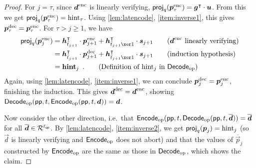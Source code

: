 \begin{proof}
For $j=\tau$, since $\boldsymbol{d}^{\mathrm{enc}}$ is linearly verifying, $\mathsf{proj}_{q}(\boldsymbol{p}_{\tau}^{\mathrm{enc}}) = \boldsymbol{g}^\intercal\cdot\boldsymbol{u}$. From this we get $\mathsf{proj}_{q}(\boldsymbol{p}_{\tau}^{\mathrm{enc}}) = \mathrm{hint}_\tau$.
Using \autoref{lem:latencode}, \autoref{item:inverse1}, this gives $\boldsymbol{p}_{\tau}^{\mathrm{dec}} = \boldsymbol{p}_{\tau}^{\mathrm{enc}}$.
For $\tau > j \geq 1$, we have
\begin{align*}
 \projmod{q}(\vec{p}_{j}^{\ENC}) &= \vec{h}_{\tilde t_{j+1}}^\transpose\cdot \vec{p}_{j+1}^{\ENC} + \vec{h}_{\tilde t_{j+1} \xor 1}^\transpose \cdot \vec{s}_{j+1} \tag{$\vec{d}^{\ENC}$ linearly verifying}\\
                               {}&= \vec{h}_{\tilde t_{j+1}}^\transpose\cdot \vec{p}_{j+1}^{\DEC} + \vec{h}_{\tilde t_{j+1} \xor 1}^\transpose \cdot \vec{s}_{j+1} \tag{induction hypothesis}\\
                               {}&= \vec{\hint}_j\enspace. \tag{Definition of $\hint_j$ in $\opendecode$}
\end{align*}
Again, using \autoref{lem:latencode}, \autoref{item:inverse1}, we can conclude $\boldsymbol{p}_j^{\mathrm{dec}} = \boldsymbol{p}_j^{\mathrm{enc}}$, finishing the induction. This gives $\boldsymbol{d}^{\mathrm{dec}} = \boldsymbol{d}^{\mathrm{enc}}$, showing $\mathsf{Decode}_{\mathrm{op}}(\mathsf{pp}, t, \mathsf{Encode}_{\mathrm{op}}(\mathsf{pp},t, \boldsymbol{d})) = \boldsymbol{d}$.



Now consider the other direction, i.e.\ that $\mathsf{Encode}_{\mathrm{op}}(\mathsf{pp}, t,\mathsf{Decode}_{\mathrm{op}}(\mathsf{pp},t,\overline{\boldsymbol{d}})) = \overline{\boldsymbol{d}}$ for all $\overline{\boldsymbol{d}}\in\mathcal{R}^{{\ell_{\mathsf{op}}}}$.
By \autoref{lem:latencode}, \autoref{item:inverse2}, we get $\mathsf{proj}_{q}(\boldsymbol{p}_j) = \mathrm{hint}_j$ (so $\vec{d}$ is linearly verifying and $\mathsf{Encode}_{\mathrm{op}}$ does not abort) and that the values of $\overline{\vec{p}}_j$ constructed by $\mathsf{Encode}_{\mathrm{op}}$ are the same as those in $\mathsf{Decode}_{\mathrm{op}}$, which shows the claim.


\end{proof}
